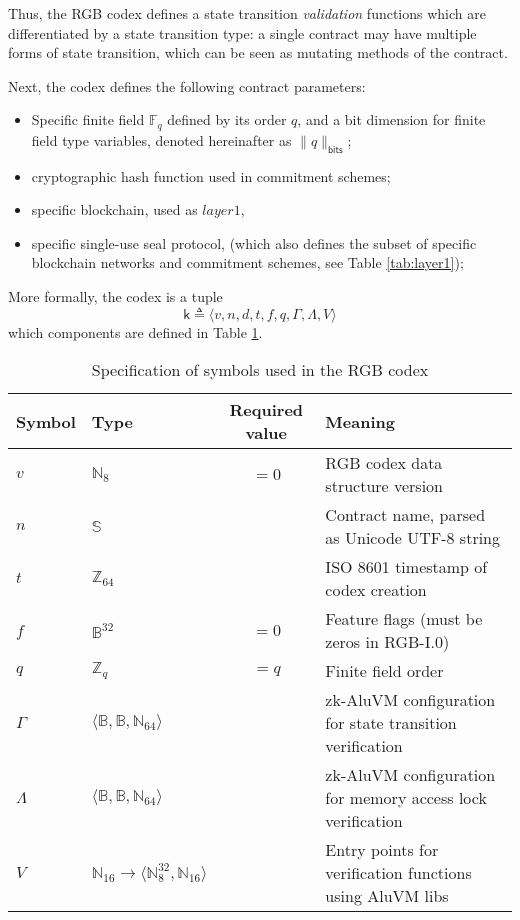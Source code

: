 \documentclass[9pt,oneside]{amsart}
\begin{document}
\begin{multicols}{2}
Thus, the RGB codex defines a state transition \emph{validation} functions
which are differentiated by a state transition type:
a single contract may have multiple forms of state transition,
which can be seen as mutating methods of the contract.

Next, the codex defines the following contract parameters:

\begin{itemize}
\item Specific finite field $\mathbb{F}_q$ defined by its order $q$,
  and a bit dimension for finite field type variables, denoted hereinafter as $\|q\|_\mathsf{bits}$;
\item cryptographic hash function used in commitment schemes;
\item specific blockchain, used as $layer 1$,
\item specific single-use seal protocol,
  (which also defines the subset of specific blockchain networks
  and commitment schemes, see Table \ref{tab:layer1});
\end{itemize}

More formally, the codex is a tuple
\noindent
\begin{equation}
\mathsf{k} \triangleq \langle v, n, d, t, f, q, \mathsf{\Gamma}, \mathsf{\Lambda}, V \rangle
\end{equation}
\noindent
which components are defined in Table \ref{tab:codex}.


\end{multicols}
\begin{table}[h]
\centering
\caption{Specification of symbols used in the RGB codex}\label{tab:codex}
\begin{tabular}{ l l c p{8cm} }
\toprule
Symbol & Type & Required value & Meaning \\
\midrule
$v$ & $\mathbb{N}_8$ & $=0$ & RGB codex data structure version \\
$n$ & $\mathbb{S}$ &  & Contract name, parsed as Unicode UTF-8 string \\
$t$ & $\mathbb{Z}_{64}$ &  & ISO 8601 timestamp of codex creation \\
$f$ & $\mathbb{B}^{32}$ & $=0$ & Feature flags (must be zeros in RGB-I.0) \\
$q$ & $\mathbb{Z}_q$ & $=q$ & Finite field order \\
$\mathsf{\Gamma}$ & $\langle \mathbb{B}, \mathbb{B}, \mathbb{N}_{64} \rangle$ &  &  zk-AluVM configuration for state transition verification \\
$\mathsf{\Lambda}$ & $\langle \mathbb{B}, \mathbb{B}, \mathbb{N}_{64} \rangle$ &  & zk-AluVM configuration for memory access lock verification \\
$V$ & $\mathbb{N}_{16} \rightarrow \langle \mathbb{N}_8^{32}, \mathbb{N}_{16} \rangle$ &  & Entry points for verification functions using AluVM libs \\
\bottomrule
\end{tabular}
\end{table}
\end{document}
